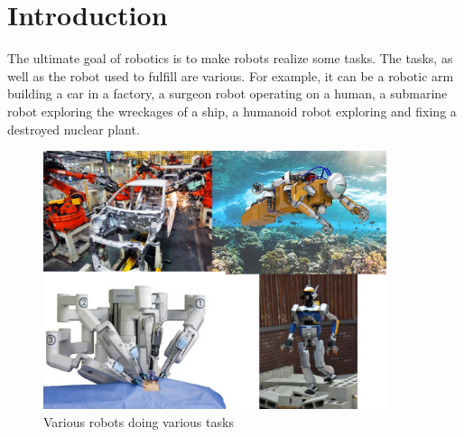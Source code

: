 
\section{Introduction}
\label{sec:introduction}



The ultimate goal of robotics is to make robots realize some tasks.
The tasks, as well as the robot used to fulfill are various.
For example, it can be a robotic arm building a car in a factory, a surgeon robot operating on a human, a submarine robot exploring the wreckages of a ship, a humanoid robot exploring and fixing a destroyed nuclear plant.
\begin{figure}[ht]
  \centering
  \includegraphics[width=0.9\textwidth]{various-tasks.png}
  \caption{Various robots doing various tasks}
  \label{fig:various}
\end{figure}

